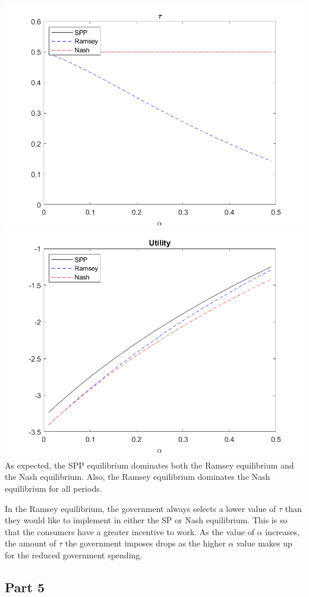 \documentclass[11pt]{article} %
\begin{document}
\includegraphics{tau}
\includegraphics{util}
As expected, the SPP equilibrium dominates both the Ramsey equilibrium and the Nash equilibrium. Also, the Ramsey equilibrium dominates the Nash equilibrium for all periods.

In the Ramsey equilibrium, the government always selects a lower value of $\tau$ than they would like to implement in either the SP or Nash equilibrium. This is so that the consumers have a greater incentive to work. As the value of $\alpha$ increases, the amount of $\tau$ the government imposes drops as the higher $\alpha$ value makes up for the reduced government spending.

\subsection{Part 5}
\end{document}
